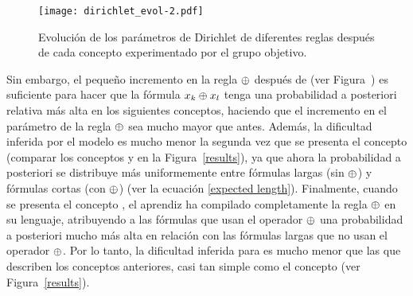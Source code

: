 \begin{figure}
        \centering
        \texttt{[image: dirichlet\_evol-2.pdf]}
        \caption{
        Evolución de los parámetros de Dirichlet de diferentes reglas después de cada concepto experimentado por el grupo objetivo.
        }
       \label{evol}
\end{figure}

Sin embargo, el pequeño incremento en la regla $ \oplus $ después de \targetb (ver Figura~) es suficiente para hacer que la fórmula $x_ {k} \oplus x_{l} $ tenga una probabilidad a posteriori relativa más alta en los siguientes conceptos, haciendo que el incremento en el parámetro de la regla $ \oplus $ sea mucho mayor que antes. Además, la dificultad inferida por el modelo es mucho menor la segunda vez que se presenta el concepto (comparar los conceptos \targetd y \targetb en la Figura~\ref{results}), ya que ahora la probabilidad a posteriori se distribuye más uniformemente entre fórmulas largas (sin $ \oplus $) y fórmulas cortas (con $ \oplus $) (ver la ecuación \eqref{expected length}). Finalmente, cuando se presenta el concepto \testa, el aprendiz ha compilado completamente la regla $ \oplus $ en su lenguaje, atribuyendo a las fórmulas que usan el operador $ \oplus $ una probabilidad a posteriori mucho más alta en relación con las fórmulas largas que no usan el operador $ \oplus $. Por lo tanto, la dificultad inferida para \testa es mucho menor que las que describen los conceptos anteriores, casi tan simple como el concepto \targeta (ver Figura~\ref{results}).

